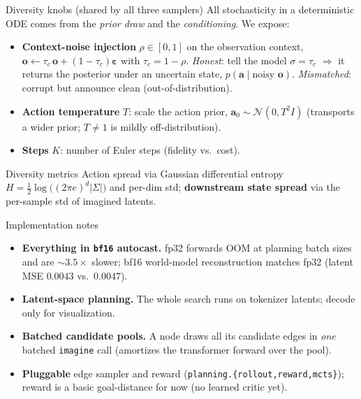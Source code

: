 \documentclass[aspectratio=169]{beamer}
\newcommand{\obs}{\bm{o}}
\newcommand{\act}{\bm{a}}
\begin{document}
\begin{frame}{Diversity knobs (shared by all three samplers)}
  All stochasticity in a deterministic ODE comes from the \emph{prior draw} and
  the \emph{conditioning}. We expose:
  \begin{itemize}
    \item \textbf{Context-noise injection} $\rho\in[0,1]$ on the observation
      context, $\obs\leftarrow \tau_c\,\obs+(1-\tau_c)\bm\varepsilon$ with
      $\tau_c=1-\rho$.
      \emph{Honest}: tell the model $\sigma=\tau_c$ $\Rightarrow$ it returns the
      posterior under an uncertain state, $p(\act\mid\text{noisy }\obs)$.
      \emph{Mismatched}: corrupt but announce clean (out-of-distribution).
    \item \textbf{Action temperature} $T$: scale the action prior,
      $\act_0\sim\mathcal N(0,T^2 I)$ (transports a wider prior; $T\!\neq\!1$ is
      mildly off-distribution).
    \item \textbf{Steps} $K$: number of Euler steps (fidelity vs.\ cost).
  \end{itemize}
  \begin{block}{Diversity metrics}
    Action spread via Gaussian differential entropy
    $H=\tfrac12\log\!\big((2\pi e)^d|\Sigma|\big)$ and per-dim std;
    \textbf{downstream state spread} via the per-sample std of imagined latents.
  \end{block}
\end{frame}

\begin{frame}{Implementation notes}
  \begin{itemize}
    \item \textbf{Everything in \texttt{bf16} autocast.} fp32 forwards OOM at
      planning batch sizes and are ${\sim}3.5\times$ slower; bf16 world-model
      reconstruction matches fp32 (latent MSE $0.0043$ vs.\ $0.0047$).
    \item \textbf{Latent-space planning.} The whole search runs on tokenizer
      latents; decode only for visualization.
    \item \textbf{Batched candidate pools.} A node draws all its candidate
      edges in \emph{one} batched \texttt{imagine} call (amortizes the
      transformer forward over the pool).
    \item \textbf{Pluggable} edge sampler and reward
      (\texttt{planning.\{rollout,reward,mcts\}}); reward is a basic
      goal-distance for now (no learned critic yet).
  \end{itemize}
\end{frame}
\end{document}

